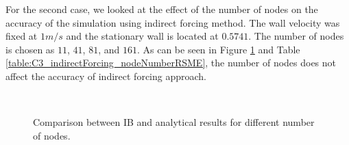 %
For the second case, we looked at the effect of the number of nodes on the accuracy of the simulation using indirect forcing method. The wall velocity was fixed at $1 m/s$ and the stationary wall is located at $0.5741$. The number of nodes is chosen as $11$, $41$, $81$, and $161$. As can be seen in Figure \ref{fig:C3_indirectForcing_nodeNumber} and Table \ref{table:C3_indirectForcing_nodeNumberRSME}, the number of nodes does not affect the accuracy of indirect forcing approach.
%
\begin{figure}[H]
    \centering
    \quad
    \\
    \quad
    \caption{Comparison between IB and analytical results for different number of nodes.}
    \label{fig:C3_indirectForcing_nodeNumber}
\end{figure}
